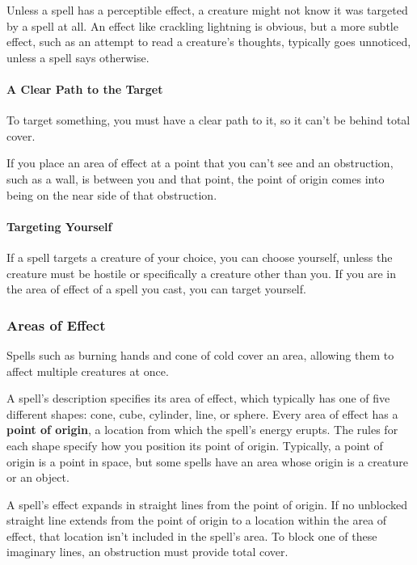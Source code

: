 \documentclass[
]{article}
\begin{document}
Unless a spell has a perceptible effect, a creature might not know it
was targeted by a spell at all. An effect like crackling lightning is
obvious, but a more subtle effect, such as an attempt to read a
creature's thoughts, typically goes unnoticed, unless a spell says
otherwise.

\hypertarget{a-clear-path-to-the-target}{%
\paragraph{A Clear Path to the
Target}\label{a-clear-path-to-the-target}}

To target something, you must have a clear path to it, so it can't be
behind total cover.

If you place an area of effect at a point that you can't see and an
obstruction, such as a wall, is between you and that point, the point of
origin comes into being on the near side of that obstruction.

\hypertarget{targeting-yourself}{%
\paragraph{Targeting Yourself}\label{targeting-yourself}}

If a spell targets a creature of your choice, you can choose yourself,
unless the creature must be hostile or specifically a creature other
than you. If you are in the area of effect of a spell you cast, you can
target yourself.

\hypertarget{areas-of-effect}{%
\subsubsection{Areas of Effect}\label{areas-of-effect}}

Spells such as burning hands and cone of cold cover an area, allowing
them to affect multiple creatures at once.

A spell's description specifies its area of effect, which typically has
one of five different shapes: cone, cube, cylinder, line, or sphere.
Every area of effect has a \textbf{point of origin}, a location from
which the spell's energy erupts. The rules for each shape specify how
you position its point of origin. Typically, a point of origin is a
point in space, but some spells have an area whose origin is a creature
or an object.

A spell's effect expands in straight lines from the point of origin. If
no unblocked straight line extends from the point of origin to a
location within the area of effect, that location isn't included in the
spell's area. To block one of these imaginary lines, an obstruction must
provide total cover.
\end{document}
